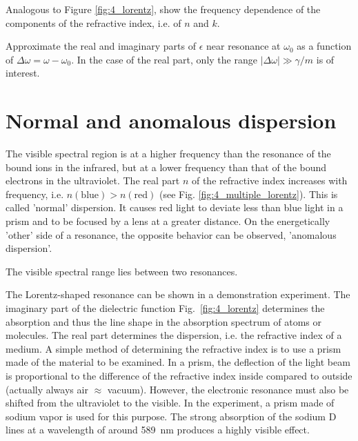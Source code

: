 \begin{questions} 
\item Analogous to Figure \ref{fig:4_lorentz}, show the frequency dependence of the components of the refractive index, i.e. of $n$ and $k$.

\item Approximate the real and imaginary parts of $\epsilon$ near resonance at $\omega_0$ as a function of $\Delta \omega = \omega - \omega_0$. In the case of the real part, only the range $| \Delta \omega | \gg \gamma/m$ is of interest.
\end{questions}




\section{Normal and  anomalous dispersion}

The visible spectral region is at a higher frequency than the resonance of the bound ions in the infrared, but at a lower frequency than that of the bound electrons in the ultraviolet. The real part $n$ of the refractive index   increases  with frequency, i.e. $n(\text{blue}) > n(\text{red})$ (see Fig. 
\ref{fig:4_multiple_lorentz}). This is called 'normal' dispersion. It causes red light to deviate less than blue light in a prism and to be focused by a lens at a greater distance. On the energetically 'other' side of a resonance, the opposite behavior can be observed, 'anomalous dispersion'.

\begin{marginfigure}
\caption{The visible spectral range lies between two resonances. \label{fig:4_multiple_lorentz}}
\end{marginfigure}


The Lorentz-shaped resonance can be shown in a demonstration experiment. The imaginary part of the dielectric function Fig.~\ref{fig:4_lorentz} determines the absorption and thus the line shape in the absorption spectrum of atoms or molecules. The real part determines the dispersion, i.e. the refractive index of a medium. A simple method of determining the refractive index is to use a prism made of the material to be examined. In a prism, the deflection of the light beam is proportional to the difference of the refractive index inside compared to outside (actually always air $\approx$ vacuum). However, the electronic resonance  must also be shifted from the ultraviolet to the visible. In the experiment, a prism made of sodium vapor is used for this purpose. The strong absorption of the sodium D lines at a wavelength of around 589~nm produces a highly visible effect. 


